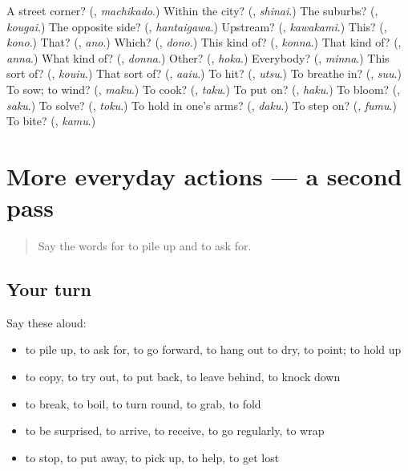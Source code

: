 \begin{tcolorbox}[breakable,colback=teal!4,colframe=teal!35!black,title={Before you move on}]
A street corner? (\textbf{}, \emph{machikado}.) Within the city? (\textbf{}, \emph{shinai}.) The suburbs? (\textbf{}, \emph{kougai}.) The opposite side? (\textbf{}, \emph{hantaigawa}.) Upstream? (\textbf{}, \emph{kawakami}.) This? (\textbf{}, \emph{kono}.) That? (\textbf{}, \emph{ano}.) Which? (\textbf{}, \emph{dono}.) This kind of? (\textbf{}, \emph{konna}.) That kind of? (\textbf{}, \emph{anna}.) What kind of? (\textbf{}, \emph{donna}.) Other? (\textbf{}, \emph{hoka}.) Everybody? (\textbf{}, \emph{minna}.) This sort of? (\textbf{}, \emph{kouiu}.) That sort of? (\textbf{}, \emph{aaiu}.) To hit? (\textbf{}, \emph{utsu}.) To breathe in? (\textbf{}, \emph{suu}.) To sow; to wind? (\textbf{}, \emph{maku}.) To cook? (\textbf{}, \emph{taku}.) To put on? (\textbf{}, \emph{haku}.) To bloom? (\textbf{}, \emph{saku}.) To solve? (\textbf{}, \emph{toku}.) To hold in one's arms? (\textbf{}, \emph{daku}.) To step on? (\textbf{}, \emph{fumu}.) To bite? (\textbf{}, \emph{kamu}.)
\end{tcolorbox}
\section[(dialogue)]{More everyday actions — a second pass}

\label{lesson:JA-R91-second-pass-more-everyday-actions}



\begin{quote}
Say the words for to pile up and to ask for.
\end{quote}

\subsection*{Your turn}
Say these aloud:

\begin{itemize}
\raggedright
  \item to pile up, to ask for, to go forward, to hang out to dry, to point; to hold up
  \item to copy, to try out, to put back, to leave behind, to knock down
  \item to break, to boil, to turn round, to grab, to fold
  \item to be surprised, to arrive, to receive, to go regularly, to wrap
  \item to stop, to put away, to pick up, to help, to get lost
\end{itemize}

